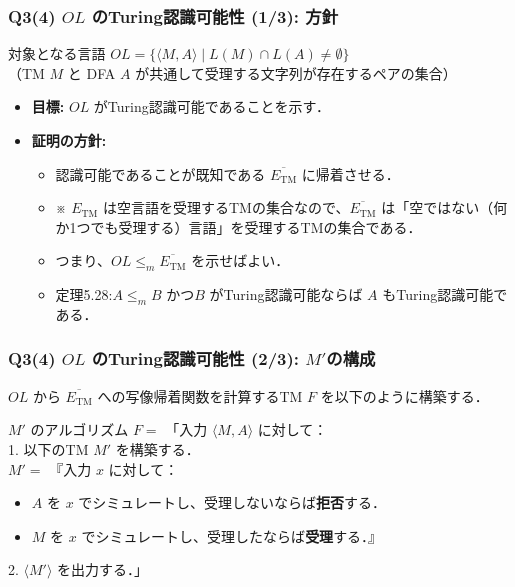 \begin{frame}[fragile]
\frametitle{Q3(4) $OL$ のTuring認識可能性 (1/3): 方針}
\begin{block}{対象となる言語}
  $OL = \{\langle M, A \rangle \mid L(M) \cap L(A) \neq \emptyset\}$\\
  （TM $M$ と DFA $A$ が共通して受理する文字列が存在するペアの集合）
\end{block}

\begin{itemize}
  \item \textbf{目標:} $OL$ がTuring認識可能であることを示す．
  \item \textbf{証明の方針:}
  \begin{itemize}
      \item 認識可能であることが既知である \alert{$\overline{E_{\mathrm{TM}}}$} に帰着させる．
      \item ※ $E_{\mathrm{TM}}$ は空言語を受理するTMの集合なので、$\overline{E_{\mathrm{TM}}}$ は「空ではない（何か1つでも受理する）言語」を受理するTMの集合である．
      \item つまり、$OL \le_m \overline{E_{\mathrm{TM}}}$ を示せばよい．
      \item 定理5.28:$A \le_m B$ かつ$B$ がTuring認識可能ならば $A$ もTuring認識可能である．
  \end{itemize}
\end{itemize}
\end{frame}

\begin{frame}[fragile]
\frametitle{Q3(4) $OL$ のTuring認識可能性 (2/3): $M'$の構成}
$OL$ から $\overline{E_{\mathrm{TM}}}$ への写像帰着関数を計算するTM $F$ を以下のように構築する．

\begin{block}{$M'$ のアルゴリズム}
  $F=$ 「入力 $\langle M, A \rangle$ に対して：\\
  1. 以下のTM $M'$ を構築する．\\
  \quad $M'=$ 『入力 $x$ に対して：
  \begin{itemize}
      \item $A$ を $x$ でシミュレートし、受理しないならば\textbf{拒否}する．
      \item $M$ を $x$ でシミュレートし、受理したならば\textbf{受理}する．』
  \end{itemize}
  2. $\langle M' \rangle$ を出力する．」
\end{block}
\end{frame}


